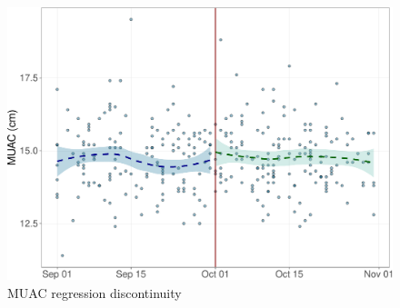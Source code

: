 \documentclass[12pt,a4paper]{article}
\begin{document}
\begin{figure}[H]

{\centering \includegraphics{kayahReport_files/figure-latex/rd5-1} 

}

\caption{MUAC regression discontinuity}\label{fig:rd5}
\end{figure}

\newpage

\renewcommand\refname{References}

\end{document}
